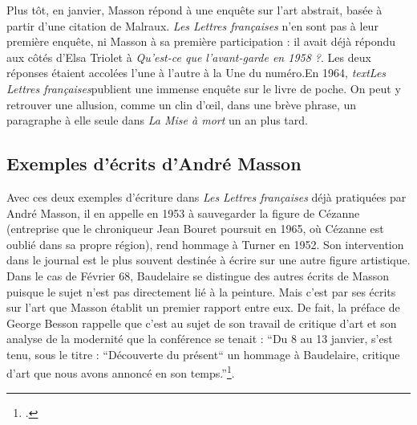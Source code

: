 	Plus tôt, en janvier, Masson répond à une enquête sur l’art abstrait, basée à partir d’une citation de Malraux. \emph{Les Lettres françaises} n’en sont pas à leur première enquête, ni Masson à sa première participation : il avait déjà répondu aux côtés d’Elsa Triolet à \emph{Qu’est-ce que l’avant-garde en 1958 ?}. Les deux réponses étaient accolées l'une à l'autre à la Une du numéro.En 1964, \emph{textLes Lettres françaises}publient une immense enquête sur le livre de poche. On peut y retrouver une allusion, comme un clin d’\oe{}il, dans une brève phrase, un paragraphe à elle seule dans \emph{La Mise à mort} un an plus tard.

\subsection{ Exemples d'écrits d'André Masson}

Avec ces deux exemples d’écriture dans \emph{Les Lettres françaises} déjà pratiquées par André Masson, il en appelle en 1953 à sauvegarder la figure de Cézanne (entreprise que le chroniqueur Jean Bouret poursuit en 1965, où Cézanne est oublié dans sa propre région), rend hommage à Turner en 1952. Son intervention dans le journal est le plus souvent destinée à écrire sur une autre figure artistique. Dans le cas de Février 68, Baudelaire se distingue des autres écrits de Masson puisque le sujet n'est pas directement lié à la peinture. Mais c’est par ses écrits sur l’art que Masson établit un premier rapport entre eux. De fait, la préface de George Besson rappelle que c’est au sujet de son travail de critique d’art et son analyse de la modernité que la conférence se tenait : \enquote{Du 8 au 13 janvier, s’est tenu, sous le titre :  “Découverte du présent“ un hommage à Baudelaire, critique d’art que nous avons annoncé en son temps.}\footcite{baudelairepeintres}.



